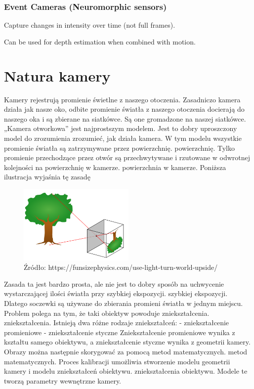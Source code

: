 \documentclass[magisterska]{pracadypl}
\begin{document}
\subsubsection{Event Cameras (Neuromorphic sensors)}
Capture changes in intensity over time (not full frames).

Can be used for depth estimation when combined with motion.

\section{Natura kamery}

Kamery rejestrują promienie świetlne z naszego otoczenia. Zasadniczo kamera działa jak
nasze oko, odbite promienie światła z naszego otoczenia docierają do naszego oka i są zbierane na siatkówce.
Są one gromadzone na naszej siatkówce.
„Kamera otworkowa” jest najprostszym modelem. Jest to dobry uproszczony model do zrozumienia
zrozumieć, jak działa kamera. W tym modelu wszystkie promienie światła są zatrzymywane przez powierzchnię.
powierzchnię. Tylko promienie przechodzące przez otwór są przechwytywane i rzutowane w odwrotnej kolejności na powierzchnię w kamerze.
powierzchnia w kamerze. Poniższa ilustracja wyjaśnia tę zasadę

\begin{figure}[h]  %
    \centering  %
    \includegraphics[width=0.5\textwidth]{images/light.png}  %
    \captionsetup{labelformat=empty, font=footnotesize}
    \caption{Źródło: https://funsizephysics.com/use-light-turn-world-upside/}
    \label{fig:rpi}  %
\end{figure}

Zasada ta jest bardzo prosta, ale nie jest to dobry sposób na uchwycenie wystarczającej ilości światła przy szybkiej ekspozycji.
szybkiej ekspozycji. Dlatego soczewki są używane do zbierania
promieni światła w jednym miejscu. Problem polega na tym, że taki obiektyw powoduje zniekształcenia.
zniekształcenia.
Istnieją dwa różne rodzaje zniekształceń:
- zniekształcenie promieniowe
- zniekształcenie styczne
Zniekształcenie promieniowe wynika z kształtu samego obiektywu, a zniekształcenie styczne
wynika z geometrii kamery. Obrazy można następnie skorygować za pomocą metod matematycznych.
metod matematycznych.
Proces kalibracji umożliwia stworzenie modelu geometrii kamery i modelu zniekształceń obiektywu.
zniekształcenia obiektywu. Modele te tworzą parametry wewnętrzne kamery.
\end{document}
